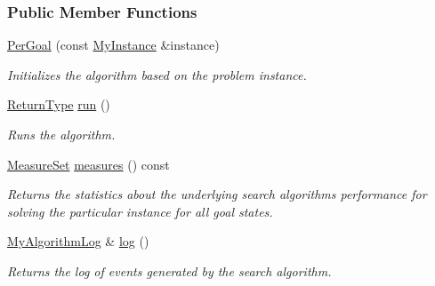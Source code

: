 \subsubsection*{Public Member Functions}
\begin{DoxyCompactItemize}
\item 
\hyperlink{structslb_1_1ext_1_1algorithm_1_1PerGoal_a73af8c0fd4ce53827c324b058b6a03fe}{Per\+Goal} (const \hyperlink{structslb_1_1ext_1_1algorithm_1_1PerGoal_ad7f8dd960e23262c376d6c3b5396cb67}{My\+Instance} \&instance)
\begin{DoxyCompactList}\small\item\em Initializes the algorithm based on the problem instance. \end{DoxyCompactList}\item 
\hyperlink{structslb_1_1ext_1_1algorithm_1_1PerGoal_a088037c56b7c784c803bc972df4da54b}{Return\+Type} \hyperlink{structslb_1_1ext_1_1algorithm_1_1PerGoal_a0f8d76dcf8c165e05c9af4e2b2c2659f}{run} ()
\begin{DoxyCompactList}\small\item\em Runs the algorithm. \end{DoxyCompactList}\item 
\hyperlink{structslb_1_1core_1_1sb_1_1MeasureSet}{Measure\+Set} \hyperlink{structslb_1_1ext_1_1algorithm_1_1PerGoal_a0c280a6f3111b59bd9a71cee9f0ff025}{measures} () const 
\begin{DoxyCompactList}\small\item\em Returns the statistics about the underlying search algorithm\textquotesingle{}s performance for solving the particular instance for all goal states. \end{DoxyCompactList}\item 
\hyperlink{structslb_1_1ext_1_1algorithm_1_1PerGoal_a28d1e8e647aeaf2c2b8f6136d6839d51}{My\+Algorithm\+Log} \& \hyperlink{structslb_1_1ext_1_1algorithm_1_1PerGoal_a1f0e37b75103ac04f8fd017dcf9cc52f}{log} ()
\begin{DoxyCompactList}\small\item\em Returns the log of events generated by the search algorithm. \end{DoxyCompactList}\end{DoxyCompactItemize}
